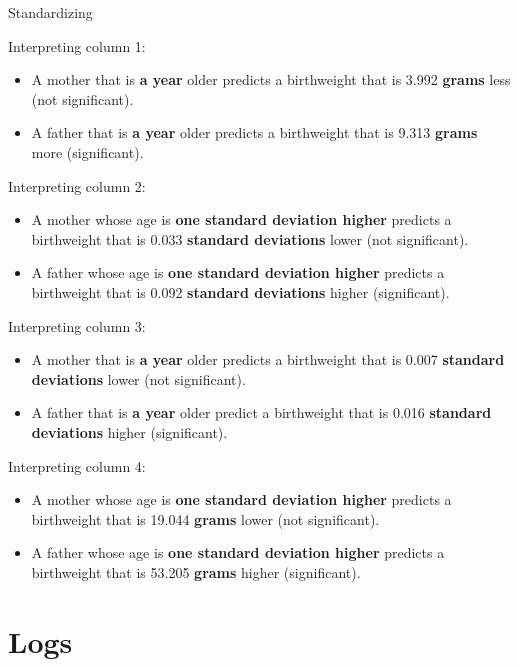 \documentclass[
  ignorenonframetext,
]{beamer}
\begin{document}
\begin{frame}{Standardizing}
\protect\hypertarget{standardizing-8}{}
\tiny

Interpreting column 1:

\begin{itemize}
\item
  A mother that is \textbf{a year} older predicts a birthweight that is
  3.992 \textbf{grams} less (not significant).
\item
  A father that is \textbf{a year} older predicts a birthweight that is
  9.313 \textbf{grams} more (significant).
\end{itemize}

Interpreting column 2:

\begin{itemize}
\item
  A mother whose age is \textbf{one standard deviation higher} predicts
  a birthweight that is 0.033 \textbf{standard deviations} lower (not
  significant).
\item
  A father whose age is \textbf{one standard deviation higher} predicts
  a birthweight that is 0.092 \textbf{standard deviations} higher
  (significant).
\end{itemize}

Interpreting column 3:

\begin{itemize}
\item
  A mother that is \textbf{a year} older predicts a birthweight that is
  0.007 \textbf{standard deviations} lower (not significant).
\item
  A father that is \textbf{a year} older predict a birthweight that is
  0.016 \textbf{standard deviations} higher (significant).
\end{itemize}

Interpreting column 4:

\begin{itemize}
\item
  A mother whose age is \textbf{one standard deviation higher} predicts
  a birthweight that is 19.044 \textbf{grams} lower (not significant).
\item
  A father whose age is \textbf{one standard deviation higher} predicts
  a birthweight that is 53.205 \textbf{grams} higher (significant).
\end{itemize}
\end{frame}

\hypertarget{logs}{%
\section{Logs}\label{logs}}
\end{document}
